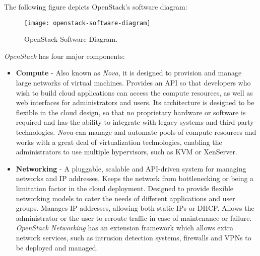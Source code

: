 The following figure depicts OpenStack's software diagram:

\begin{figure}[h]
  \begin{center}
    \leavevmode
    \texttt{[image: openstack-software-diagram]}
    \caption{OpenStack Software Diagram\cite{openstack}.}
    \label{fig:openstack_sw_diag}
  \end{center}
\end{figure}

\textit{OpenStack} has four major components:

\begin{itemize}
\item \textbf{Compute} - Also known as \textit{Nova}, it is designed to provision and manage large networks of virtual machines. Provides an API so that developers who wish to build cloud applications can access the compute resources, as well as web interfaces for administrators and users. Its architecture is designed to be flexible in the cloud design, so that no proprietary hardware or software is required and has the ability to integrate with legacy systems and third party technologies. \textit{Nova} can manage and automate pools of compute resources and works with a great deal of virtualization technologies, enabling the administrators to use multiple hypervisors, such as KVM or XenServer.
\item \textbf{Networking} - A pluggable, scalable and API-driven system for managing networks and IP addresses. Keeps the network from bottlenecking or being a limitation factor in the cloud deployment. Designed to provide flexible networking models to cater the needs of different applications and user groups. Manages IP addresses, allowing both static IPs or DHCP. Allows the administrator or the user to reroute traffic in case of maintenance or failure. \textit{OpenStack Networking} has an extension framework which allows extra network services, such as intrusion detection systems, firewalls and VPNs to be deployed and managed.

\end{itemize}
